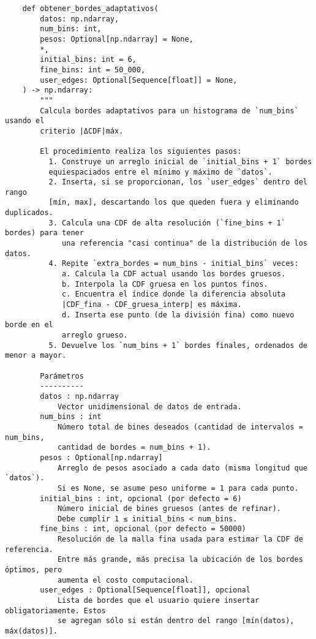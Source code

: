 \begin{verbatim}
    def obtener_bordes_adaptativos(
        datos: np.ndarray,
        num_bins: int,
        pesos: Optional[np.ndarray] = None,
        *,
        initial_bins: int = 6,
        fine_bins: int = 50_000,
        user_edges: Optional[Sequence[float]] = None,
    ) -> np.ndarray:
        """
        Calcula bordes adaptativos para un histograma de `num_bins` usando el 
        criterio |ΔCDF|máx.
    
        El procedimiento realiza los siguientes pasos:
          1. Construye un arreglo inicial de `initial_bins + 1` bordes 
          equiespaciados entre el mínimo y máximo de `datos`.
          2. Inserta, si se proporcionan, los `user_edges` dentro del rango 
          [mín, max], descartando los que queden fuera y eliminando duplicados.
          3. Calcula una CDF de alta resolución (`fine_bins + 1` bordes) para tener
             una referencia "casi continua" de la distribución de los datos.
          4. Repite `extra_bordes = num_bins - initial_bins` veces:
             a. Calcula la CDF actual usando los bordes gruesos.
             b. Interpola la CDF gruesa en los puntos finos.
             c. Encuentra el índice donde la diferencia absoluta
             |CDF_fina - CDF_gruesa_interp| es máxima.
             d. Inserta ese punto (de la división fina) como nuevo borde en el 
             arreglo grueso.
          5. Devuelve los `num_bins + 1` bordes finales, ordenados de menor a mayor.
    
        Parámetros
        ----------
        datos : np.ndarray
            Vector unidimensional de datos de entrada.
        num_bins : int
            Número total de bines deseados (cantidad de intervalos = num_bins,
            cantidad de bordes = num_bins + 1).
        pesos : Optional[np.ndarray]
            Arreglo de pesos asociado a cada dato (misma longitud que `datos`).
            Si es None, se asume peso uniforme = 1 para cada punto.
        initial_bins : int, opcional (por defecto = 6)
            Número inicial de bines gruesos (antes de refinar).
            Debe cumplir 1 ≤ initial_bins < num_bins.
        fine_bins : int, opcional (por defecto = 50000)
            Resolución de la malla fina usada para estimar la CDF de referencia.
            Entre más grande, más precisa la ubicación de los bordes óptimos, pero
            aumenta el costo computacional.
        user_edges : Optional[Sequence[float]], opcional
            Lista de bordes que el usuario quiere insertar obligatoriamente. Estos
            se agregan sólo si están dentro del rango [mín(datos), máx(datos)].
    

\end{verbatim}

